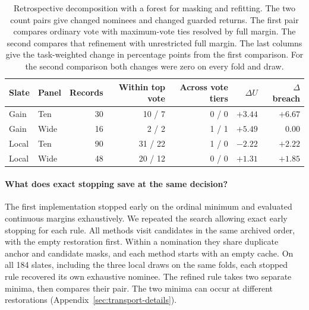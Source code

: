 \begin{table}[tb]
\centering\small
\caption{Retrospective decomposition with a forest for masking and refitting. The two count pairs give changed nominees and changed guarded returns. The first pair compares ordinary vote with maximum-vote ties resolved by full margin. The second compares that refinement with unrestricted full margin. The last columns give the task-weighted change in percentage points from the first comparison. For the second comparison both changes were zero on every fold and draw.}
\label{tab:tier}
\begin{tabular}{@{}llrrrrr@{}}
\toprule
Slate & Panel & Records & Within top vote & Across vote tiers & $\Delta U$ & $\Delta$ breach\\
\midrule
Gain & Ten & 30 & 10 / 7 & 0 / 0 & $+3.44$ & $+6.67$\\
Gain & Wide & 16 & 2 / 2 & 1 / 1 & $+5.49$ & 0.00\\
Local & Ten & 90 & 31 / 22 & 1 / 0 & $-2.22$ & $+2.22$\\
Local & Wide & 48 & 20 / 12 & 0 / 0 & $+1.31$ & $+1.85$\\
\bottomrule
\end{tabular}
\end{table}

\paragraph{What does exact stopping save at the same decision?}
The first implementation stopped early on the ordinal minimum and evaluated continuous margins exhaustively. We repeated the search allowing exact early stopping for each rule. All methods visit candidates in the same archived order, with the empty restoration first. Within a nomination they share duplicate anchor and candidate masks, and each method starts with an empty cache. On all 184 slates, including the three local draws on the same folds, each stopped rule recovered its own exhaustive nominee. The refined rule takes two separate minima, then compares their pair. The two minima can occur at different restorations (Appendix~\ref{sec:transport-details}).

